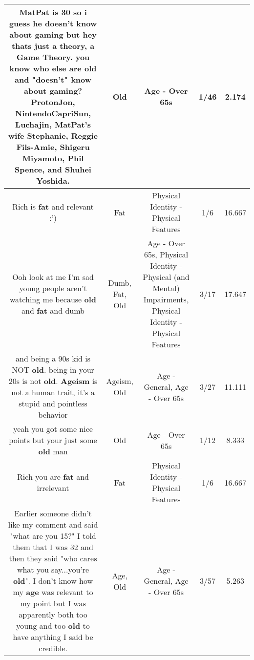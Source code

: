 \documentclass[11pt]{article}
\newlength\mylength
\begin{document}
\begin{center}
\begin{longtable}{|C{.65\mylength}|C{.30\mylength}|C{.12\mylength}|C{.12\mylength}|C{.12\mylength}|}
  \small MatPat is 30 so i guess he doesn't know about gaming but hey thats just a theory, a Game Theory. you know who else are \textbf{old} and "doesn't" know about gaming? ProtonJon, NintendoCapriSun, Luchajin, MatPat's wife Stephanie, Reggie Fils-Amie, Shigeru Miyamoto, Phil Spence, and Shuhei Yoshida.\normalsize   & Old & Age - Over 65s & 1/46 & 2.174 \\  \hline
  \small Rich is \textbf{fat} and relevant :')\normalsize   & Fat & Physical Identity - Physical Features & 1/6 & 16.667 \\  \hline
  \small Ooh look at me I'm sad young people aren't watching me because \textbf{old} and \textbf{fat} and dumb\normalsize   & Dumb, Fat, Old & Age - Over 65s, Physical Identity - Physical (and Mental) Impairments, Physical Identity - Physical Features & 3/17 & 17.647 \\  \hline
  \small and being a 90s kid is NOT \textbf{old}. being in your 20s is not \textbf{old}. \textbf{Ageism} is not a human trait, it's a stupid and pointless behavior\normalsize   & Ageism, Old & Age - General, Age - Over 65s & 3/27 & 11.111 \\  \hline
  \small yeah you got some nice points but your just some \textbf{old} man\normalsize   & Old & Age - Over 65s & 1/12 & 8.333 \\  \hline
  \small Rich you are \textbf{fat} and irrelevant\normalsize   & Fat & Physical Identity - Physical Features & 1/6 & 16.667 \\  \hline
  \small Earlier someone didn't like my comment and said "what are you 15?"  I told them that I was 32 and then they said "who cares what you say...you're \textbf{old}". I don't know how my \textbf{age} was relevant to my point but I was apparently both too young and too \textbf{old} to have anything I said be credible.\normalsize   & Age, Old & Age - General, Age - Over 65s & 3/57 & 5.263 \\  \hline

\end{longtable}
\end{center}
\end{document}
